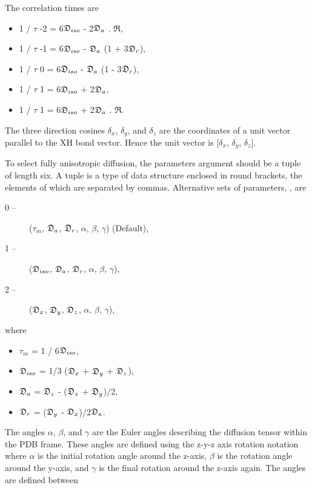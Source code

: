The correlation times are


\begin{itemize}
\item[] 1 / $\tau$ -2 = 6$\mathfrak{D}_{iso}$ - 2$\mathfrak{D}_a$ . $\mathfrak{R}$, 
\item[] 1 / $\tau$ -1 = 6$\mathfrak{D}_{iso}$ - $\mathfrak{D}_a$ (1 + 3$\mathfrak{D}_r$), 
\item[] 1 / $\tau$ 0  = 6$\mathfrak{D}_{iso}$ - $\mathfrak{D}_a$ (1 - 3$\mathfrak{D}_r$), 
\item[] 1 / $\tau$ 1  = 6$\mathfrak{D}_{iso}$ + 2$\mathfrak{D}_a$, 
\item[] 1 / $\tau$ 1  = 6$\mathfrak{D}_{iso}$ + 2$\mathfrak{D}_a$ . $\mathfrak{R}$. 
\end{itemize}


The three direction cosines $\delta_x$, $\delta_y$, and $\delta_z$ are the coordinates of a unit vector parallel to the XH bond vector.  Hence the unit vector is [$\delta_x$, $\delta_y$, $\delta_z$].


To select fully anisotropic diffusion, the parameters argument should be a tuple of length six.  A tuple is a type of data structure enclosed in round brackets, the elements of which are separated by commas.  Alternative sets of parameters, , are


\begin{description}
\item[0 --]  ($\tau_m$, $\mathfrak{D}_a$, $\mathfrak{D}_r$, $\alpha$, $\beta$, $\gamma$)   (Default), 
\item[1 --]  ($\mathfrak{D}_{iso}$, $\mathfrak{D}_a$, $\mathfrak{D}_r$, $\alpha$, $\beta$, $\gamma$), 
\item[2 --]  ($\mathfrak{D}_x$, $\mathfrak{D}_y$, $\mathfrak{D}_z$, $\alpha$, $\beta$, $\gamma$), 
\end{description}


where


\begin{itemize}
\item[] $\tau_m$ = 1 / 6$\mathfrak{D}_{iso}$, 
\item[] $\mathfrak{D}_{iso}$ = 1/3 ($\mathfrak{D}_x$ + $\mathfrak{D}_y$ + $\mathfrak{D}_z$), 
\item[] $\mathfrak{D}_a$ = $\mathfrak{D}_z$ - ($\mathfrak{D}_x$ + $\mathfrak{D}_y$)/2, 
\item[] $\mathfrak{D}_r$ = ($\mathfrak{D}_y$ - $\mathfrak{D}_x$)/2$\mathfrak{D}_a$. 
\end{itemize}


The angles $\alpha$, $\beta$, and $\gamma$ are the Euler angles describing the diffusion tensor within the PDB frame.  These angles are defined using the z-y-z axis rotation notation where $\alpha$ is the initial rotation angle around the z-axis, $\beta$ is the rotation angle around the y-axis, and $\gamma$ is the final rotation around the z-axis again.  The angles are defined between


